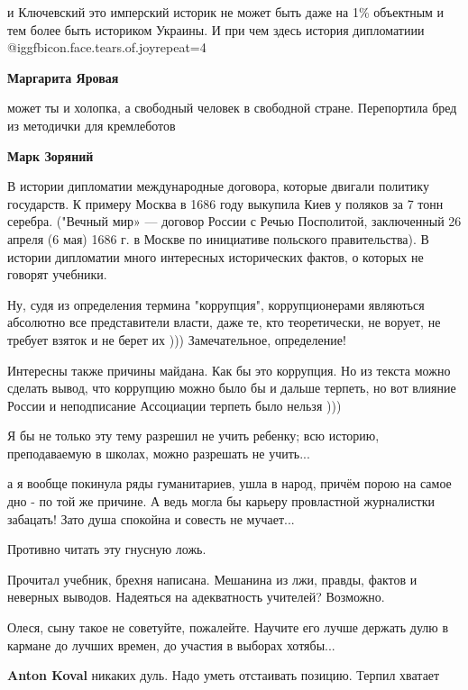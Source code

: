 \begin{itemize}
\begin{itemize}
и Ключевский это имперский историк не может быть даже на 1\% объектным и тем
более быть историком Украины. И при чем здесь история дипломатиии @igg{fbicon.face.tears.of.joy}{repeat=4} 

\textbf{Маргарита Яровая} 

может ты и холопка, а свободный человек в свободной стране. Перепортила бред из
методички для кремлеботов

\textbf{Марк Зоряний} 

В истории дипломатии международные договора, которые двигали политику
государств. К примеру Москва в 1686 году выкупила Киев у поляков за 7 тонн
серебра. ("Вечный мир» — договор России с Речью Посполитой, заключенный 26
апреля (6 мая) 1686 г. в Москве по инициативе польского правительства). В
истории дипломатии много интересных исторических фактов, о которых не говорят
учебники.

\end{itemize} %


Ну, судя из определения термина "коррупция", коррупционерами являються
абсолютно все представители власти, даже те, кто теоретически, не ворует, не
требует взяток и не берет их ))) Замечательное, определение!

Интересны также причины майдана. Как бы это коррупция. Но из текста можно
сделать вывод, что коррупцию можно было бы и дальше терпеть, но вот влияние
России и неподписание Ассоциации терпеть было нельзя )))

Я бы не только эту тему разрешил не учить ребенку; всю историю, преподаваемую в
школах, можно разрешать не учить...


а я вообще покинула ряды гуманитариев, ушла в народ, причём порою на самое дно
- по той же причине. А ведь могла бы карьеру провластной журналистки забацать!
Зато душа спокойна и совесть не мучает...

Противно читать эту гнусную ложь.

Прочитал учебник, брехня написана. Мешанина из лжи, правды, фактов и неверных выводов. Надеяться на адекватность учителей? Возможно.

Олеся, сыну такое не советуйте, пожалейте. Научите его лучше держать дулю в кармане до лучших времен, до участия в выборах хотябы...

\begin{itemize} %
\textbf{Anton Koval} никаких дуль. Надо уметь отстаивать позицию. Терпил хватает
\end{itemize} %


\end{itemize}
